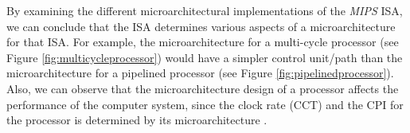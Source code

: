 By examining the different microarchitectural implementations of the {\it MIPS} ISA, we can conclude that the ISA determines various aspects of a microarchitecture for that ISA. For example, the microarchitecture for a multi-cycle processor (see Figure \ref{fig:multicycleprocessor}) would have a simpler control unit/path than the microarchitecture for a pipelined processor (see Figure \ref{fig:pipelinedprocessor}). Also, we can observe that the microarchitecture design of a processor affects the performance of the computer system, since the clock rate (CCT) and the CPI for the processor is determined by its microarchitecture \cite{Patterson2005}. \\

